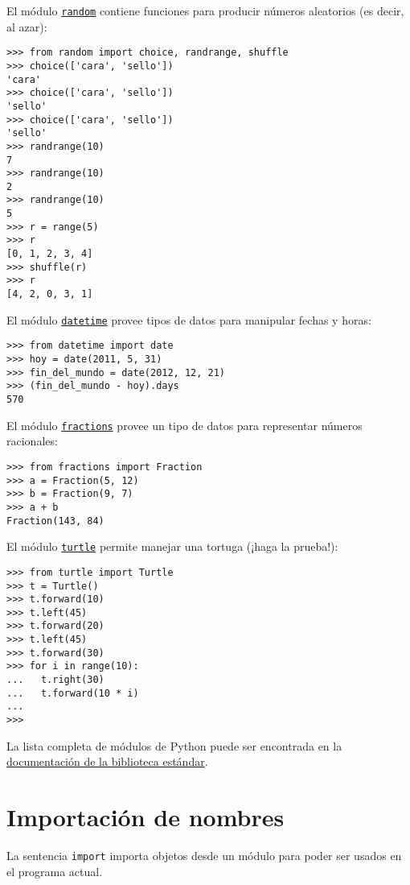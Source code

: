 El módulo \href{http://docs.python.org/library/random.html}{\lstinline!random!}
contiene funciones para producir números aleatorios (es decir, al azar):

\begin{lstlisting}
>>> from random import choice, randrange, shuffle
>>> choice(['cara', 'sello'])
'cara'
>>> choice(['cara', 'sello'])
'sello'
>>> choice(['cara', 'sello'])
'sello'
>>> randrange(10)
7
>>> randrange(10)
2
>>> randrange(10)
5
>>> r = range(5)
>>> r
[0, 1, 2, 3, 4]
>>> shuffle(r)
>>> r
[4, 2, 0, 3, 1]
\end{lstlisting}

El módulo \href{http://docs.python.org/library/datetime.html}{\lstinline!datetime!}
provee tipos de datos para manipular fechas y horas:

\begin{lstlisting}
>>> from datetime import date
>>> hoy = date(2011, 5, 31)
>>> fin_del_mundo = date(2012, 12, 21)
>>> (fin_del_mundo - hoy).days
570
\end{lstlisting}

El módulo
\href{http://docs.python.org/library/fractions.html}{\lstinline!fractions!} provee
un tipo de datos para representar números racionales:

\begin{lstlisting}
>>> from fractions import Fraction
>>> a = Fraction(5, 12)
>>> b = Fraction(9, 7)
>>> a + b
Fraction(143, 84)
\end{lstlisting}

El módulo \href{http://docs.python.org/library/turtle.html}{\lstinline!turtle!}
permite manejar una tortuga (¡haga la prueba!):

\begin{lstlisting}
>>> from turtle import Turtle
>>> t = Turtle()
>>> t.forward(10)
>>> t.left(45)
>>> t.forward(20)
>>> t.left(45)
>>> t.forward(30)
>>> for i in range(10):
...   t.right(30)
...   t.forward(10 * i)
...
>>>
\end{lstlisting}

La lista completa de módulos de Python puede ser encontrada en la
\href{http://docs.python.org/library/index.html}{documentación de la
biblioteca estándar}.

\section{Importación de nombres}

La sentencia \lstinline!import! importa objetos desde un módulo para
poder ser usados en el programa actual.

